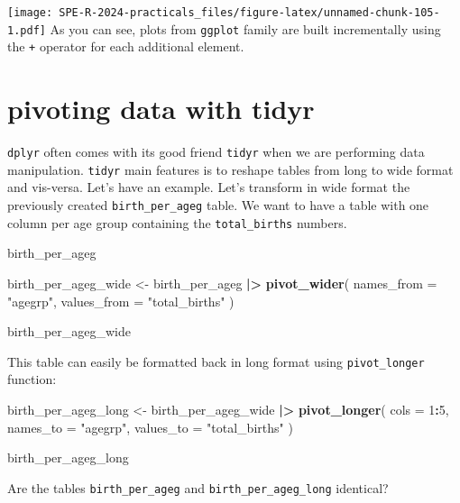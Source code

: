 \documentclass[
]{book}
\newenvironment{Shaded}{\begin{snugshade}}{\end{snugshade}}
\newcommand{\AttributeTok}[1]{\textcolor[rgb]{0.13,0.29,0.53}{#1}}
\newcommand{\DecValTok}[1]{\textcolor[rgb]{0.00,0.00,0.81}{#1}}
\newcommand{\FunctionTok}[1]{\textcolor[rgb]{0.13,0.29,0.53}{\textbf{#1}}}
\newcommand{\NormalTok}[1]{#1}
\newcommand{\OtherTok}[1]{\textcolor[rgb]{0.56,0.35,0.01}{#1}}
\newcommand{\SpecialCharTok}[1]{\textcolor[rgb]{0.81,0.36,0.00}{\textbf{#1}}}
\newcommand{\StringTok}[1]{\textcolor[rgb]{0.31,0.60,0.02}{#1}}
\begin{document}
\texttt{[image: SPE-R-2024-practicals\_files/figure-latex/unnamed-chunk-105-1.pdf]}
As you can see, plots from \texttt{ggplot} family are built incrementally using the \texttt{+} operator for each additional element.

\section{pivoting data with tidyr}\label{pivoting-data-with-tidyr}

\texttt{dplyr} often comes with its good friend \texttt{tidyr} when we are performing data manipulation. \texttt{tidyr} main features is to reshape tables from long to wide format and vis-versa. Let's have an example.
Let's transform in wide format the previously created \texttt{birth\_per\_ageg} table.
We want to have a table with one column per age group containing the \texttt{total\_births} numbers.

\begin{Shaded}
\begin{Highlighting}[]
\NormalTok{birth\_per\_ageg}

\NormalTok{birth\_per\_ageg\_wide }\OtherTok{\textless{}{-}}
\NormalTok{  birth\_per\_ageg }\SpecialCharTok{|\textgreater{}}
  \FunctionTok{pivot\_wider}\NormalTok{(}
    \AttributeTok{names\_from =} \StringTok{"agegrp"}\NormalTok{, }
    \AttributeTok{values\_from =} \StringTok{"total\_births"}
\NormalTok{  )}

\NormalTok{birth\_per\_ageg\_wide}
\end{Highlighting}
\end{Shaded}

This table can easily be formatted back in long format using \texttt{pivot\_longer} function:

\begin{Shaded}
\begin{Highlighting}[]
\NormalTok{birth\_per\_ageg\_long }\OtherTok{\textless{}{-}}
\NormalTok{  birth\_per\_ageg\_wide }\SpecialCharTok{|\textgreater{}}
  \FunctionTok{pivot\_longer}\NormalTok{(}
    \AttributeTok{cols =} \DecValTok{1}\SpecialCharTok{:}\DecValTok{5}\NormalTok{, }
    \AttributeTok{names\_to =} \StringTok{"agegrp"}\NormalTok{, }
    \AttributeTok{values\_to =} \StringTok{"total\_births"}
\NormalTok{  )}

\NormalTok{birth\_per\_ageg\_long}
\end{Highlighting}
\end{Shaded}

Are the tables \texttt{birth\_per\_ageg} and \texttt{birth\_per\_ageg\_long} identical?
\end{document}
